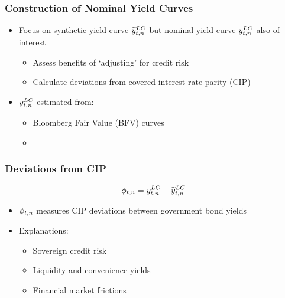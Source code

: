 \documentclass[12pt, aspectratio=169, xcolor=dvipsnames]{beamer} 			         %
\begin{document}
\begin{frame}
\frametitle{Construction of \textbf{Nominal} Yield Curves}
\begin{itemize}
	\item Focus on synthetic yield curve $\widetilde{y}_{t,n} ^{LC}$ but nominal yield curve $y_{t,n} ^{LC}$ also of interest
	\begin{itemize}
		\item Assess benefits of `adjusting' for credit risk
		\item Calculate deviations from covered interest rate parity (CIP)
	\end{itemize}
	\item $y_{t,n} ^{LC}$ estimated from:
	\begin{itemize}
		\item Bloomberg Fair Value (BFV) curves
		\item \cite{NelsonSiegel:1987}
	\end{itemize}
\end{itemize}
\end{frame}

\begin{frame}
\frametitle{Deviations from CIP}
\vspace{-0.8cm}
$$\phi_{t,n} = y_{t,n} ^{LC} - \widetilde{y}_{t,n} ^{LC}$$
\vspace{-1cm}
\begin{itemize}
	\item $\phi_{t,n}$ measures CIP deviations between government bond yields
	\item Explanations:
	\begin{itemize}
		\item Sovereign credit risk \citep{DuSchreger:2016a}
		\item Liquidity and convenience yields \citep*{DuImSchreger:2018}
		\item Financial market frictions \citep*{DuTepperVerdelhan:2018}
	\end{itemize}
\end{itemize}
\end{frame}
\end{document}
